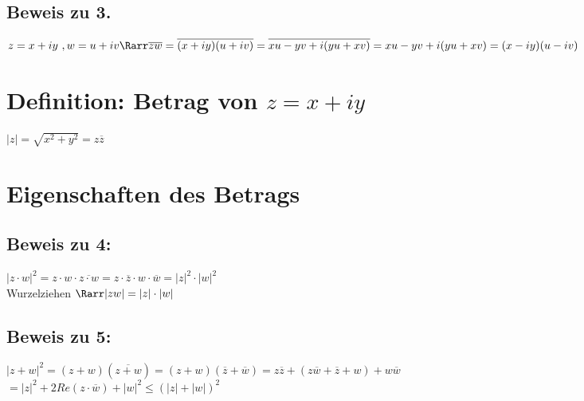 %
\subsection{Beweis zu 3.}
$z = x+iy\ , w = u+iv \Rarr \overline{zw} = \overline{(x+iy) (u+iv)} = \overline{xu - yv + i(yu + xv)} = xu - yv + i(yu + xv) = (x-iy)(u-iv)$
\section{Definition: Betrag von $z = x+iy$}
$|z| = \sqrt{x^2 + y^2} = z\overline{z}$
\section{Eigenschaften des Betrags}
\subsection*{Beweis zu 4:}
$|z\cdot w|^2 = z\cdot w \cdot \overline{z\cdot w} = z\cdot \overline{z} \cdot w \cdot \overline{w} = |z|^2 \cdot |w|^2$\\
Wurzelziehen $\Rarr |zw| = |z|\cdot |w|$
\subsection*{Beweis zu 5:}
$|z+w|^2=(z+w)(\overline{z+w}) = (z+w)(\overline{z} + \overline{w}) = z\overline{z} + (z\overline{w} + \overline{z} + w)+ w\overline{w}$\\
$=|z|^2 + 2 Re(z\cdot \overline{w}) + |w|^2 ≤ (|z|+|w|)^2$
